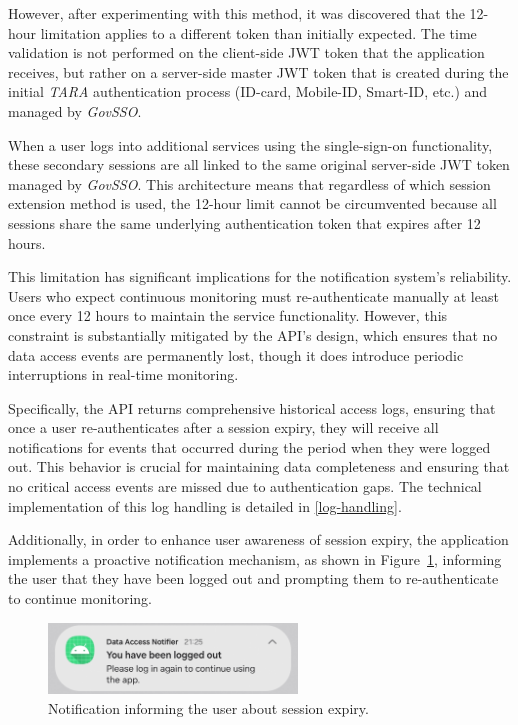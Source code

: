 However, after experimenting with this method, it was discovered that the 12-hour limitation applies to a different token than initially expected. The time validation is not performed on the client-side JWT token that the application receives, but rather on a server-side master JWT token that is created during the initial \textit{TARA} authentication process (ID-card, Mobile-ID, Smart-ID, etc.) and managed by \textit{GovSSO}.

When a user logs into additional services using the single-sign-on functionality, these secondary sessions are all linked to the same original server-side JWT token managed by \textit{GovSSO}. This architecture means that regardless of which session extension method is used, the 12-hour limit cannot be circumvented because all sessions share the same underlying authentication token that expires after 12 hours.

This limitation has significant implications for the notification system's reliability. Users who expect continuous monitoring must re-authenticate manually at least once every 12 hours to maintain the service functionality. However, this constraint is substantially mitigated by the API's design, which ensures that no data access events are permanently lost, though it does introduce periodic interruptions in real-time monitoring.

Specifically, the API returns comprehensive historical access logs, ensuring that once a user re-authenticates after a session expiry, they will receive all notifications for events that occurred during the period when they were logged out. This behavior is crucial for maintaining data completeness and ensuring that no critical access events are missed due to authentication gaps. The technical implementation of this log handling is detailed in \ref{log-handling}.

Additionally, in order to enhance user awareness of session expiry, the application implements a proactive notification mechanism, as shown in Figure~\ref{fig:session-expiry-notification}, informing the user that they have been logged out and prompting them to re-authenticate to continue monitoring.

\begin{figure}[H]
\centering
\includegraphics[width=250px]{english/figures/Screenshot_20250812_212624_Data Access Notifier.jpg}
\caption{Notification informing the user about session expiry.}
\label{fig:session-expiry-notification}
\end{figure}

